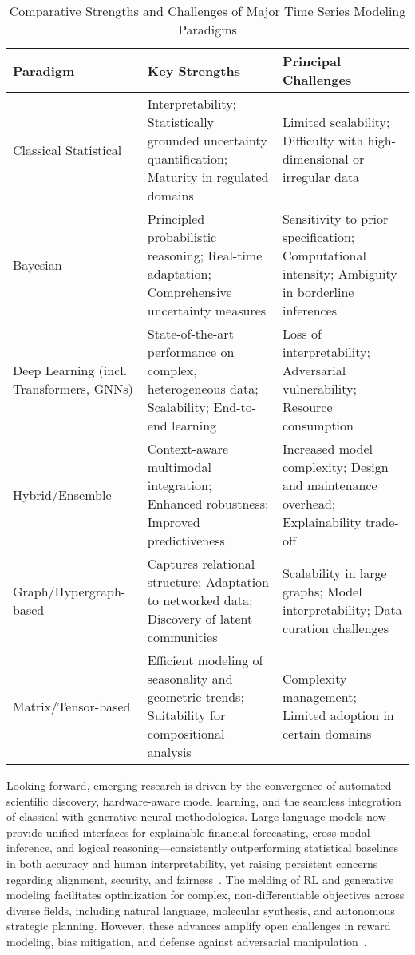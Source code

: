 \documentclass[sigconf]{acmart}
\begin{document}
\begin{table*}[htbp]
\centering
\caption{Comparative Strengths and Challenges of Major Time Series Modeling Paradigms}
\label{tab:paradigm_features}
\begin{adjustbox}{max width=\textwidth}
\begin{tabular}{lll}
\toprule
\textbf{Paradigm} & \textbf{Key Strengths} & \textbf{Principal Challenges} \\
\midrule
Classical Statistical & Interpretability; Statistically grounded uncertainty quantification; Maturity in regulated domains & Limited scalability; Difficulty with high-dimensional or irregular data \\
Bayesian & Principled probabilistic reasoning; Real-time adaptation; Comprehensive uncertainty measures & Sensitivity to prior specification; Computational intensity; Ambiguity in borderline inferences \\
Deep Learning (incl. Transformers, GNNs) & State-of-the-art performance on complex, heterogeneous data; Scalability; End-to-end learning & Loss of interpretability; Adversarial vulnerability; Resource consumption \\
Hybrid/Ensemble & Context-aware multimodal integration; Enhanced robustness; Improved predictiveness & Increased model complexity; Design and maintenance overhead; Explainability trade-off \\
Graph/Hypergraph-based & Captures relational structure; Adaptation to networked data; Discovery of latent communities & Scalability in large graphs; Model interpretability; Data curation challenges \\
Matrix/Tensor-based & Efficient modeling of seasonality and geometric trends; Suitability for compositional analysis & Complexity management; Limited adoption in certain domains \\
\bottomrule
\end{tabular}
\end{adjustbox}
\end{table*}

Looking forward, emerging research is driven by the convergence of automated scientific discovery, hardware-aware model learning, and the seamless integration of classical with generative neural methodologies. Large language models now provide unified interfaces for explainable financial forecasting, cross-modal inference, and logical reasoning—consistently outperforming statistical baselines in both accuracy and human interpretability, yet raising persistent concerns regarding alignment, security, and fairness~\cite{ref11,ref20,ref30}. The melding of RL and generative modeling facilitates optimization for complex, non-differentiable objectives across diverse fields, including natural language, molecular synthesis, and autonomous strategic planning. However, these advances amplify open challenges in reward modeling, bias mitigation, and defense against adversarial manipulation~\cite{ref11,ref31,ref79}.
\end{document}

